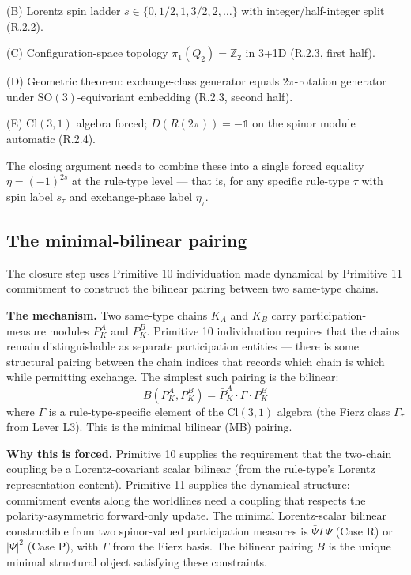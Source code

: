 \documentclass[11pt,a4paper]{article}
\begin{document}
(B) Lorentz spin ladder $s \in \{0, 1/2, 1, 3/2, 2, \ldots\}$ with integer/half-integer split (R.2.2).

(C) Configuration-space topology $\pi_1(Q_2) = \mathbb{Z}_2$ in 3+1D (R.2.3, first half).

(D) Geometric theorem: exchange-class generator equals $2\pi$-rotation generator under $\mathrm{SO}(3)$-equivariant embedding (R.2.3, second half).

(E) $\mathrm{Cl}(3,1)$ algebra forced; $D(R(2\pi)) = -\mathbb{1}$ on the spinor module automatic (R.2.4).

The closing argument needs to combine these into a single forced equality $\eta = (-1)^{2s}$ at the rule-type level --- that is, for any specific rule-type $\tau$ with spin label $s_\tau$ and exchange-phase label $\eta_\tau$.

\subsection{The minimal-bilinear pairing}

The closure step uses Primitive 10 individuation made dynamical by Primitive 11 commitment to construct the bilinear pairing between two same-type chains.

\textbf{The mechanism.} Two same-type chains $K_A$ and $K_B$ carry participation-measure modules $P_K^A$ and $P_K^B$. Primitive 10 individuation requires that the chains remain distinguishable as separate participation entities --- there is some structural pairing between the chain indices that records which chain is which while permitting exchange. The simplest such pairing is the bilinear:
\[
B(P_K^A, P_K^B) = \bar P_K^A \cdot \Gamma \cdot P_K^B
\]
where $\Gamma$ is a rule-type-specific element of the $\mathrm{Cl}(3,1)$ algebra (the Fierz class $\Gamma_\tau$ from Lever L3). This is the minimal bilinear (MB) pairing.

\textbf{Why this is forced.} Primitive 10 supplies the requirement that the two-chain coupling be a Lorentz-covariant scalar bilinear (from the rule-type's Lorentz representation content). Primitive 11 supplies the dynamical structure: commitment events along the worldlines need a coupling that respects the polarity-asymmetric forward-only update. The minimal Lorentz-scalar bilinear constructible from two spinor-valued participation measures is $\bar\Psi \Gamma \Psi$ (Case R) or $|\Psi|^{2}$ (Case P), with $\Gamma$ from the Fierz basis. The bilinear pairing $B$ is the unique minimal structural object satisfying these constraints.
\end{document}
